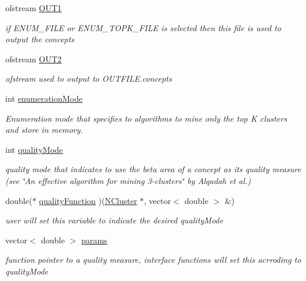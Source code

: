 \begin{DoxyCompactItemize}
ofstream \hyperlink{class_lattice_algos_a5e06ea8a8e76d5b6019481e778655a5c}{OUT1}
\begin{DoxyCompactList}\small\item\em if ENUM\_\-FILE or ENUM\_\-TOPK\_\-FILE is selected then this file is used to output the concepts \item\end{DoxyCompactList}\item 
ofstream \hyperlink{class_lattice_algos_ad6ee83e69ef859717cbc747edf4fc306}{OUT2}
\begin{DoxyCompactList}\small\item\em ofstream used to output to OUTFILE.concepts \item\end{DoxyCompactList}\item 
int \hyperlink{class_lattice_algos_a03adc61166377c993b4d1ef8f8ee12ee}{enumerationMode}
\begin{DoxyCompactList}\small\item\em Enumeration mode that specifies to algorithms to mine only the top K clusters and store in memory. \item\end{DoxyCompactList}\item 
int \hyperlink{class_lattice_algos_aabdafd3fa45b3ed1d773b313e3a60e17}{qualityMode}
\begin{DoxyCompactList}\small\item\em quality mode that indicates to use the beta area of a concept as its quality measure (see \char`\"{}An effective algorithm for mining 3-\/clusters\char`\"{} by Alqadah et al.) \item\end{DoxyCompactList}\item 
double($\ast$ \hyperlink{class_lattice_algos_ae25f31284b5956278f390d0edc412ef8}{qualityFunction} )(\hyperlink{class_n_cluster}{NCluster} $\ast$, vector$<$ double $>$ \&)
\begin{DoxyCompactList}\small\item\em user will set this variable to indicate the desired qualityMode \item\end{DoxyCompactList}\item 
vector$<$ double $>$ \hyperlink{class_lattice_algos_a84a7c48411084ff5d792af41e57ce96a}{params}
\begin{DoxyCompactList}\small\item\em function pointer to a quality measure, interface functions will set this acrroding to qualityMode \item\end{DoxyCompactList}\item 

\end{DoxyCompactItemize}
